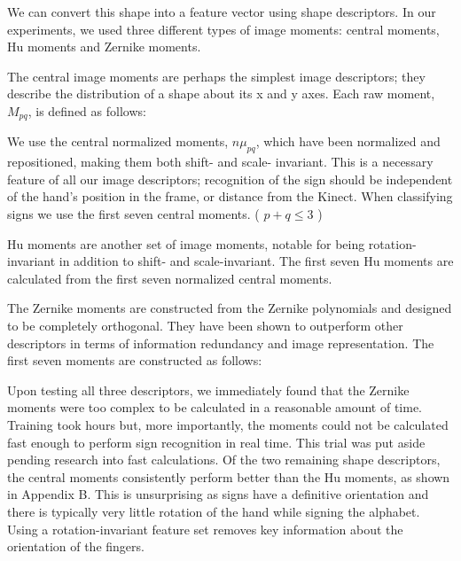\documentclass[12pt]{article}
\begin{document}
We can convert this shape into a feature vector using shape descriptors. In our experiments, we used three different types of image moments: central moments, Hu moments and Zernike moments.

The central image moments are perhaps the simplest image descriptors; they describe the distribution of a shape about its x and y axes. Each raw moment, \(M_{pq}\), is defined as follows:


We use the central normalized moments, \({n\mu}_{pq}\), which have been normalized and repositioned, making them both shift- and scale- invariant. This is a necessary feature of all our image descriptors; recognition of the sign should be independent of the hand’s position in the frame, or distance from the Kinect.  When classifying signs we use the first seven central moments. ( \(p+q \leq 3\) )

Hu moments are another set of image moments, notable for being rotation-invariant in addition to shift- and scale-invariant. The first seven Hu moments are calculated from the first seven normalized central moments.

The Zernike moments are constructed from the Zernike polynomials and designed to be completely orthogonal. They have been shown to outperform other descriptors in terms of information redundancy and image representation.  The first seven moments are constructed as follows:


Upon testing all three descriptors, we immediately found that the Zernike moments were too complex to be calculated in a reasonable amount of time. Training took hours but, more importantly, the moments could not be calculated fast enough to perform sign recognition in real time. This trial was put aside pending research into fast calculations. Of the two remaining shape descriptors, the central moments consistently perform better than the Hu moments, as shown in Appendix B. This is unsurprising as signs have a definitive orientation and there is typically very little rotation of the hand while signing the alphabet. Using a rotation-invariant feature set removes key information about the orientation of the fingers. 
\end{document}

